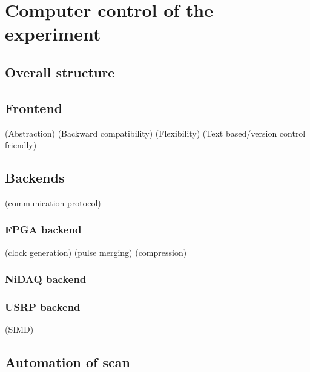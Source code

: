 
\chapter{Computer control of the experiment}

\section{Overall structure}

\section{Frontend}
(Abstraction)
(Backward compatibility)
(Flexibility)
(Text based/version control friendly)

\section{Backends}
(communication protocol)

\subsection{FPGA backend}
(clock generation)
(pulse merging)
(compression)

\subsection{NiDAQ backend}

\subsection{USRP backend}
(SIMD)

\section{Automation of scan}

